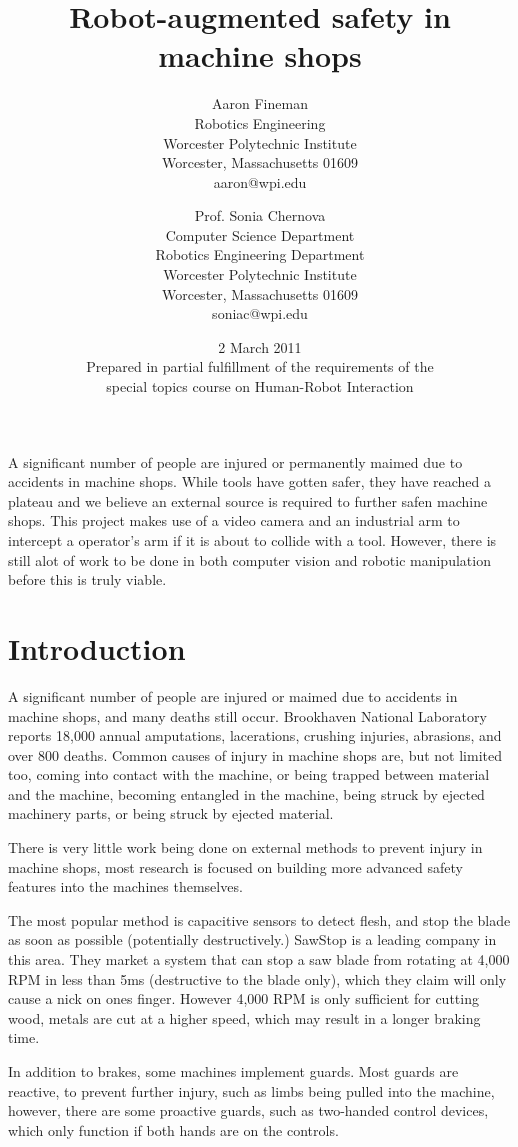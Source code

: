 \documentclass[12pt]{article}
\title{Robot-augmented safety in machine shops\\}
\author{
	Aaron Fineman\\
	\small{Robotics Engineering}\\
	\small{Worcester Polytechnic Institute}\\
	\small{Worcester, Massachusetts 01609}\\
	\small{aaron@wpi.edu}
	\and
	Prof. Sonia Chernova\\
	\small{Computer Science Department}\\
	\small{Robotics Engineering Department}\\
	\small{Worcester Polytechnic Institute}\\
	\small{Worcester, Massachusetts 01609}\\
	\small{soniac@wpi.edu}
}
\date{2 March 2011\\\small{Prepared in partial fulfillment of the requirements of the\\ special topics course on Human-Robot Interaction}}
\begin{document}
\maketitle
\newpage

\abstract
A significant number of people are injured or permanently maimed due to accidents in machine shops. While tools have gotten safer, they have reached a plateau and we believe an external source is required to further safen machine shops. This project makes use of a video camera and an industrial arm to intercept a operator's arm if it is about to collide with a tool. However, there is still alot of work to be done in both computer vision and robotic manipulation before this is truly viable.

\section{Introduction}
A significant number of people are injured or maimed due to accidents in machine shops, and many deaths still occur. Brookhaven National Laboratory reports 18,000 annual amputations, lacerations, crushing injuries, abrasions, and over 800 deaths\cite{BNL:safety}. Common causes of injury in machine shops are, but not limited too, coming into contact with the machine, or being trapped between material and the machine, becoming entangled in the machine, being struck by ejected machinery parts, or being struck by ejected material\cite{HKUST:safety}.

There is very little work being done on external methods to prevent injury in machine shops, most research is focused on building more advanced safety features into the machines themselves.

The most popular method is capacitive sensors to detect flesh, and stop the blade as soon as possible (potentially destructively.) SawStop is a leading company in this area. They market a system that can stop a saw blade from rotating at 4,000 RPM in less than 5ms (destructive to the blade only), which they claim will only cause a nick on ones finger. However 4,000 RPM is only sufficient for cutting wood, metals are cut at a higher speed, which may result in a longer braking time.

In addition to brakes, some machines implement guards\cite{HKUST:safety}. Most guards are reactive, to prevent further injury, such as limbs being pulled into the machine, however, there are some proactive guards, such as two-handed control devices, which only function if both hands are on the controls.
\end{document}
